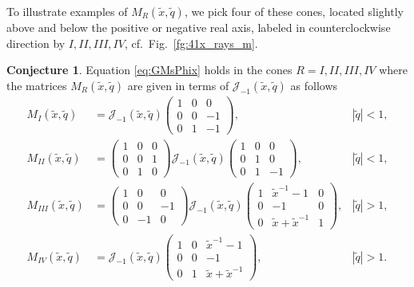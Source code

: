 \documentclass[12pt,reqno]{amsart}
\theoremstyle{definition}
\newtheorem{conjecture}[theorem]{Conjecture}
\def\tq{\tilde{q}}
\def\tx{\tilde{x}}
\def\tx{\tilde{x}}
\def\mc{\mathcal}
\begin{document}
To illustrate examples of $M_R(\tx,\tq)$, we pick four of these cones,
located slightly above and below the positive or negative real axis,
labeled in counterclockwise direction by $I,II,III,IV$, cf.~Fig.~\ref{fg:41x_rays_m}.
\begin{conjecture}
  Equation \eqref{eq:GMsPhix} holds in the cones $R=I,II,III,IV$ where
  the matrices $M_R(\tx,\tq)$ are given in terms of
  $\mc{J}_{-1}(\tx,\tq)$ as follows 
  \begin{subequations}
    \begin{align}
      M_I(\tx,\tq) &= \mc{J}_{-1}(\tx,\tq)
      \begin{pmatrix}
        1&0&0\\
        0&0&-1\\
        0&1&-1
      \end{pmatrix}, & |\tq|<1,\\
      M_{II}(\tx,\tq) &=
        \begin{pmatrix}
          1&0&0\\
          0&0&1\\
          0&1&0
        \end{pmatrix}
        \mc{J}_{-1}(\tx,\tq)
      \begin{pmatrix}
        1&0&0\\
        0&1&0\\
        0&1&-1
      \end{pmatrix}, & |\tq|<1,\\
      M_{III}(\tx,\tq) &=
        \begin{pmatrix}
          1&0&0\\
          0&0&-1\\
          0&-1&0
        \end{pmatrix}
        \mc{J}_{-1}(\tx,\tq)
      \begin{pmatrix}
        1&\tx^{-1}-1&0\\
        0&-1&0\\
        0&\tx+\tx^{-1}&1
      \end{pmatrix}, & |\tq|>1,\\
      M_{IV}(\tx,\tq) &= \mc{J}_{-1}(\tx,\tq)
      \begin{pmatrix}
        1&0&\tx^{-1}-1\\
        0&0&-1\\
        0&1&\tx+\tx^{-1}
      \end{pmatrix}, & |\tq|>1.
    \end{align}
  \end{subequations}
\end{conjecture}
\end{document}
